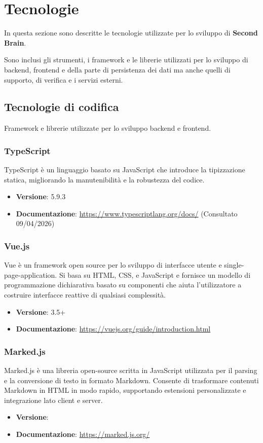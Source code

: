 \documentclass[a4paper,10pt]{article}
\begin{document}
\newpage

\section{Tecnologie}
In questa sezione sono descritte le tecnologie utilizzate per lo sviluppo di \textbf{Second Brain}.

Sono inclusi gli strumenti, i framework e le librerie utilizzati per lo sviluppo di backend, frontend e della parte di persistenza dei dati ma anche quelli di supporto, di verifica e i servizi esterni.
\subsection{Tecnologie di codifica}
Framework e librerie utilizzate per lo sviluppo backend e frontend.

\subsubsection{TypeScript}
TypeScript è un linguaggio basato su JavaScript che introduce la tipizzazione statica, migliorando la manutenibilità e la robustezza del codice.
\begin{itemize}
    \item \textbf{Versione}: 5.9.3
    \item \textbf{Documentazione}: \url{https://www.typescriptlang.org/docs/} (Consultato 09/04/2026)
\end{itemize}

\subsubsection{Vue.js}
Vue è un framework open source per lo sviluppo di interfacce utente e single-page-application. Si basa su HTML, CSS, e JavaScript e fornisce un modello di programmazione dichiarativa basato su componenti che aiuta l'utilizzatore a costruire interfacce reattive di qualsiasi complessità.
\begin{itemize}
    \item \textbf{Versione}: 3.5+
    \item \textbf{Documentazione}: \url{https://vuejs.org/guide/introduction.html}
\end{itemize}

\subsubsection{Marked.js}
Marked.js è una libreria open-source scritta in JavaScript utilizzata per il parsing e la conversione di testo in formato Markdown. Consente di trasformare contenuti Markdown in HTML in modo rapido, supportando estensioni personalizzate e integrazione lato client e server.
\begin{itemize}
    \item \textbf{Versione}:
    \item \textbf{Documentazione}: \url{https://marked.js.org/}
\end{itemize}
\end{document}
